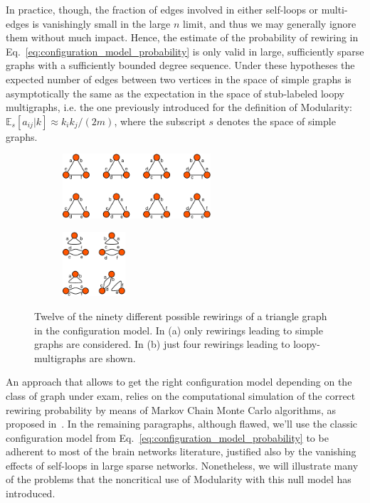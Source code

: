 In practice, though, the fraction of edges involved in either self-loops or multi-edges is vanishingly small in the large $n$ limit, and thus we may generally ignore them without much impact. 
Hence, the estimate of the probability of rewiring in Eq.~\ref{eq:configuration_model_probability} is only valid in large, sufficiently sparse graphs with a sufficiently bounded degree sequence.
Under these hypotheses the expected number of edges between two vertices in the space of simple graphs is asymptotically the same as the expectation in the space of stub-labeled loopy multigraphs, i.e. the one previously introduced for the definition of Modularity: $\mathbb{E}_s[a_{ij} |k] \approx k_i k_j /(2m)$, where the subscript $s$ denotes the space of simple graphs.

\begin{figure}[htb]\centering
\begin{subfigure}[t]{0.45\textwidth}\centering
\includegraphics[height=2.4cm]{images/configuration_model_six_stubs.pdf}
\caption{}
\label{fig:reshuffle_simple_graphs}
\end{subfigure}
\begin{subfigure}[t]{0.45\textwidth}\centering
\includegraphics[height=2.4cm]{images/configuration_model_three_stubs.pdf}
\caption{}
\label{fig:reshuffle_loopy_multigraphs}
\end{subfigure}
\caption{Twelve of the ninety different possible rewirings of a triangle graph in the configuration model. In (a) only rewirings leading to simple graphs are considered. In (b) just four rewirings leading to loopy-multigraphs are shown.}
\label{fig:configuration_model_stubs}
\end{figure}
An approach that allows to get the right configuration model depending on the class of graph under exam, relies on the computational simulation of the correct rewiring probability by means of Markov Chain Monte Carlo algorithms, as proposed in~\cite{fosdick2016}.
In the remaining paragraphs, although flawed, we'll use the classic configuration model from Eq.~\ref{eq:configuration_model_probability} to be adherent to most of the brain networks literature, justified also by the vanishing effects of self-loops in large sparse networks. Nonetheless, we will illustrate many of the problems that the noncritical use of Modularity with this null model has introduced.

